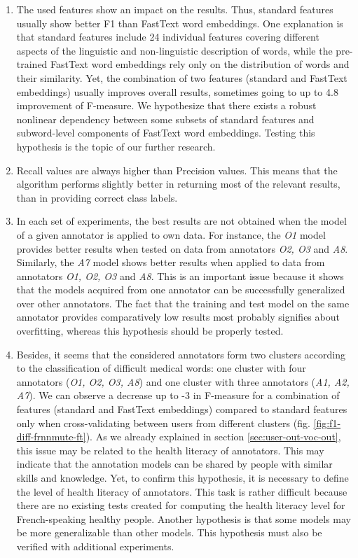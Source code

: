 \begin{enumerate}[listparindent=1.5em]
    \item The used features show an impact on the results. Thus, standard features usually show better F1 than FastText word embeddings. One explanation is that standard features include 24 individual features covering different aspects of the linguistic and non-linguistic description of words, while the pre-trained FastText word embeddings rely only on the distribution of words and their similarity. Yet, the combination of two features (standard and FastText embeddings) usually improves overall results, sometimes going to up to 4.8 improvement of F-measure.  We hypothesize that there exists a robust nonlinear dependency between some subsets of standard features and subword-level components of FastText word embeddings. Testing this hypothesis is the topic of our further research.
    
    \item Recall values are always higher than Precision values. This means that the algorithm performs slightly better in returning most of the relevant results, than in providing correct class labels. 
    
    \item In each set of experiments, the best results are not obtained when the model of a given annotator is applied to own data. For instance, the {\it O1} model provides better results when tested on data from annotators {\it O2, O3} and {\it A8}.  Similarly, the {\it A7} model shows better results when applied to data from annotators {\it O1, O2, O3} and {\it A8}. This is an important issue because it shows that the models acquired from one annotator can be successfully generalized over other annotators. The fact that the training and test model on the same annotator provides comparatively low results most probably signifies about overfitting, whereas this hypothesis should be properly tested.
    
    \item Besides, it seems that the considered annotators form two clusters according to the classification of difficult medical words: one cluster with four annotators ({\it O1, O2, O3, A8}) and one cluster with three annotators ({\it A1, A2, A7}). We can observe a decrease up to -3 in F-measure for a combination of features (standard and FastText embeddings) compared to standard features only when cross-validating between users from different clusters (fig. \ref{fig:f1-diff-frnnmute-ft}). As we already explained in section \ref{sec:user-out-voc-out}, this issue may be related to the health literacy of annotators. This may indicate that the annotation models can be shared by people with similar skills and knowledge. Yet, to confirm this hypothesis, it is necessary to define the level of health literacy of annotators. This task is rather difficult because there are no existing tests created for computing the health literacy level for French-speaking healthy people. Another hypothesis is that some models may be more generalizable than other models. This hypothesis must also be verified with additional experiments.
\end{enumerate}

